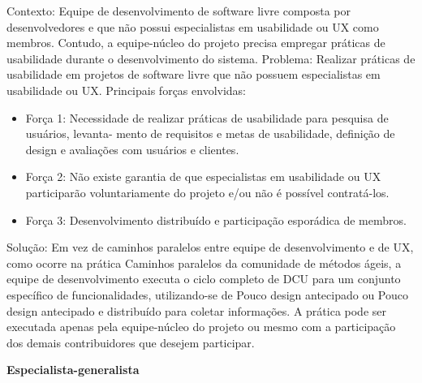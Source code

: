 Contexto: Equipe de desenvolvimento de software livre composta por desenvolvedores e que não possui especialistas em usabilidade ou UX como membros. Contudo, a equipe-núcleo do projeto precisa empregar práticas de usabilidade durante o desenvolvimento do sistema.
Problema: Realizar práticas de usabilidade em projetos de software livre que não possuem especialistas em usabilidade ou UX. Principais forças envolvidas:
\begin{itemize}
\item Força 1: Necessidade de realizar práticas de usabilidade para pesquisa de usuários, levanta- mento de requisitos e metas de usabilidade, definição de design e avaliações com usuários e clientes.
\item Força 2: Não existe garantia de que especialistas em usabilidade ou UX participarão voluntariamente do projeto e/ou não é possível contratá-los.
\item Força 3: Desenvolvimento distribuído e participação esporádica de membros.
\end{itemize}
Solução: Em vez de caminhos paralelos entre equipe de desenvolvimento e de UX, como ocorre na prática Caminhos paralelos da comunidade de métodos ágeis, a equipe de desenvolvimento executa o ciclo completo de DCU para um conjunto específico de funcionalidades, utilizando-se de Pouco design antecipado ou Pouco design antecipado e distribuído para coletar informações. A prática pode ser executada apenas pela equipe-núcleo do projeto ou mesmo com a participação dos demais contribuidores que desejem participar.

%
\textbf{Especialista-generalista}

